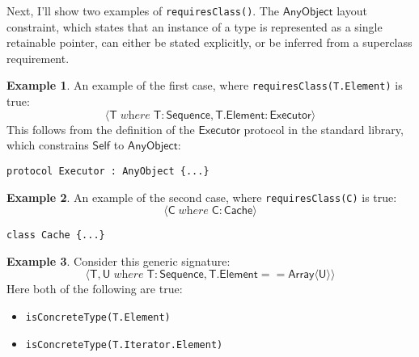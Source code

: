 \documentclass[headsepline,bibliography=totoc]{scrreport}
\newcommand{\namesym}[1]{\mathsf{#1}}
\newcommand{\genericparam}[1]{\bm{\mathsf{#1}}}
\newcommand{\proto}[1]{\bm{\mathsf{#1}}}
\newcommand{\gensig}[2]{\langle #1\;\textit{where}\;#2\rangle}
\theoremstyle{definition}
\newtheorem{example}{Example}[chapter]
\theoremstyle{definition}
\theoremstyle{definition}
\begin{document}
Next, I'll show two examples of \texttt{requiresClass()}. The $\namesym{AnyObject}$ layout constraint, which states that an instance of a type is represented as a single retainable pointer, can either be stated explicitly, or be inferred from a superclass requirement.

\begin{example}
An example of the first case, where \texttt{requiresClass(T.Element)} is true:
\[\gensig{\genericparam{T}}{\genericparam{T}\colon\proto{Sequence}, \genericparam{T}.\namesym{Element}\colon\proto{Executor}}\]
This follows from the definition of the $\proto{Executor}$ protocol in the standard library, which constrains $\genericparam{Self}$ to $\namesym{AnyObject}$:
\begin{Verbatim}
protocol Executor : AnyObject {...}
\end{Verbatim}
\end{example}

\begin{example}An example of the second case, where \texttt{requiresClass(C)} is true:
\[\gensig{\genericparam{C}}{\genericparam{C}\colon\namesym{Cache}}\]
\begin{Verbatim}
class Cache {...}
\end{Verbatim}
\end{example}

\begin{example}
Consider this generic signature:
\[\gensig{\genericparam{T},\genericparam{U}}{\genericparam{T}\colon\proto{Sequence},\genericparam{T}.\namesym{Element}==\namesym{Array}\langle\genericparam{U}\rangle}\]
Here both of the following are true:
\begin{itemize}
\item \texttt{isConcreteType(T.Element)}
\item \texttt{isConcreteType(T.Iterator.Element)}
\end{itemize}
\end{example}
\end{document}
